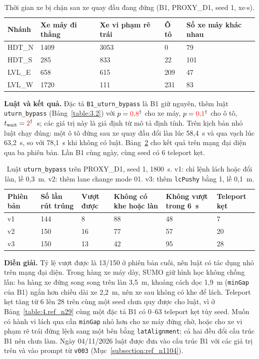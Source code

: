 \documentclass[../main.tex]{subfiles}
\begin{document}
\begin{table}[H]
\centering
\small
\caption{Thời gian xe bị chặn sau xe quay đầu đang đứng (B1, PROXY\_D1, seed 1, xe$\cdot$s).} \label{table:4.uturn_block}
\begin{tabular}{|p{3.2cm}|p{2.6cm}|p{2.8cm}|p{1.6cm}|p{2.2cm}|}
\hline
\textbf{Nhánh} & \textbf{Xe máy đi thẳng} & \textbf{Xe vi phạm rẽ trái} & \textbf{Ô tô} & \textbf{Số xe máy khác nhau} \\ \hline
HDT\_N & 1409 & 3053 & 0 & 79 \\ \hline
HDT\_S & 285 & 833 & 22 & 101 \\ \hline
LVL\_E & 658 & 615 & 209 & 47 \\ \hline
LVL\_W & 1720 & 111 & 231 & 83 \\ \hline
\end{tabular}
\end{table}

\textbf{Luật và kết quả.} Đặc tả \texttt{B1\_uturn\_bypass} là B1 giữ nguyên, thêm luật \texttt{uturn\_bypass} (Bảng~\ref{table:3.2}) với $p = \textcolor{red}{0{,}8}^{\dagger}$ cho xe máy, $p = \textcolor{red}{0{,}1}^{\dagger}$ cho ô tô, $t_{\text{wait}} = \textcolor{red}{2}^{\dagger}$~s; các giá trị này là giả định từ mô tả định tính. Trên kịch bản nhỏ luật chạy đúng: một ô tô đứng sau xe quay đầu đổi làn lúc 58,4~s và qua vạch lúc 63,2~s, so với 78,1~s khi không có luật. Bảng~\ref{table:4.uturn_rule} cho kết quả trên mạng đại diện qua ba phiên bản. Lần B1 cùng ngày, cùng seed có 6 teleport kẹt.

\begin{table}[H]
\centering
\small
\caption{Luật \texttt{uturn\_bypass} trên PROXY\_D1, seed 1, 1800~s. v1: chỉ lệnh lách hoặc đổi làn, lề 0,3~m. v2: thêm lane change mode 01. v3: thêm \texttt{lcPushy} bằng 1, lề 0,1~m.} \label{table:4.uturn_rule}
\begin{tabular}{|p{1.4cm}|p{1.9cm}|p{1.9cm}|p{2.6cm}|p{2.6cm}|p{1.9cm}|}
\hline
\textbf{Phiên bản} & \textbf{Số lần rút trúng} & \textbf{Vượt được} & \textbf{Không có khe hoặc làn} & \textbf{Không vượt trong 6~s} & \textbf{Teleport kẹt} \\ \hline
v1 & 144 & 8 & 88 & 48 & 7 \\ \hline
v2 & 150 & 16 & 77 & 57 & 20 \\ \hline
v3 & 150 & 13 & 42 & 95 & 28 \\ \hline
\end{tabular}
\end{table}

\textbf{Diễn giải.} Tỷ lệ vượt được là 13/150 ở phiên bản cuối, nên luật có tác dụng nhỏ trên mạng đại diện. Trong hàng xe máy dày, SUMO giữ hình học không chồng lấn: ba hàng xe đứng song song trên làn 3,5~m, khoảng cách dọc 1,9~m (\texttt{minGap} của B1) ngắn hơn chiều dài xe 2,2~m, nên xe sau không có khe để lách. Teleport kẹt tăng từ 6 lên 28 trên cùng một seed chưa quy được cho luật, vì ở Bảng~\ref{table:4.ref_n29} cùng một đặc tả B1 có 0--63 teleport kẹt tùy seed. Muốn có hành vi lách qua cần \texttt{minGap} nhỏ hơn cho xe máy đứng chờ, hoặc cho xe vi phạm rẽ trái đứng lệch sang một bên bằng \texttt{latAlignment}; cả hai đều đổi cấu trúc B1 nên chưa làm. Ngày 04/11/2026 luật được đưa vào cấu trúc B1 với các giá trị trên và vào prompt từ \texttt{v003} (Mục~\ref{subsection:ref_n1104}).
\end{document}

